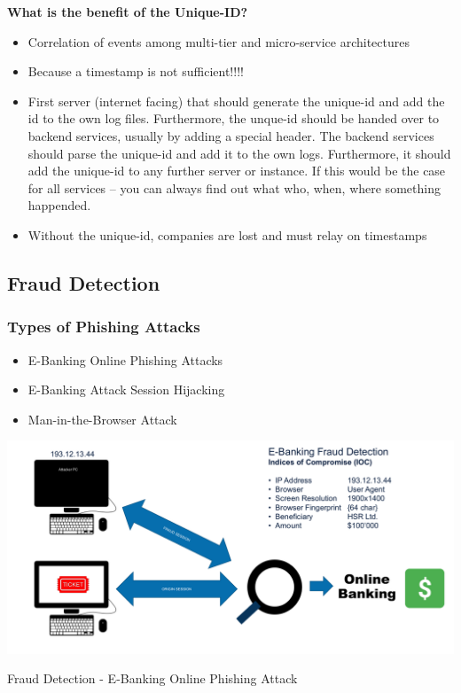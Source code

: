 \textbf{What is the benefit of the Unique-ID?}
\begin{itemize}
  \item Correlation of events among multi-tier and micro-service architectures
  \item Because a timestamp is not sufficient!!!!
  \item First server (internet facing) that should generate the unique-id and add the id to the own log files. Furthermore, the unque-id should be handed over to backend services, usually by adding a special header. The backend services should parse the unique-id and add it to the own logs. Furthermore, it should add the unique-id to any further server or instance. If this would be the case for all services – you can always find out what who, when, where something happended.
  \item Without the unique-id, companies are lost and must relay on timestamps
\end{itemize}

\subsection{Fraud Detection}
\subsubsection{Types of Phishing Attacks}
\begin{itemize}
  \item E-Banking Online Phishing Attacks
  \item E-Banking Attack Session Hijacking
  \item Man-in-the-Browser Attack
\end{itemize}

\begin{table}[h]
  \centering
  \includegraphics[width=\textwidth]{resources/12-frau-detection.png}
  \caption{Fraud Detection - E-Banking Online Phishing Attack}
\end{table}

